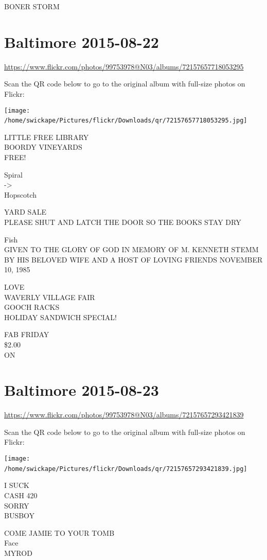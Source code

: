 \documentclass[10pt,letterpaper]{article}
\begin{document}
BONER STORM
\

\section*{Baltimore 2015-08-22}

\url{https://www.flickr.com/photos/99753978@N03/albums/72157657718053295}

Scan the QR code below to go to the original album with full-size photos on Flickr:

\texttt{[image: /home/swickape/Pictures/flickr/Downloads/qr/72157657718053295.jpg]}
\

LITTLE FREE LIBRARY\\
BOORDY VINEYARDS\\
FREE!

Spiral\\
{-}>\\
Hopscotch

YARD SALE\\
PLEASE SHUT AND LATCH THE DOOR SO THE BOOKS STAY DRY

Fish\\
GIVEN TO THE GLORY OF GOD IN MEMORY OF M. KENNETH STEMM BY HIS BELOVED WIFE AND A HOST OF LOVING FRIENDS NOVEMBER 10, 1985

LOVE\\
WAVERLY VILLAGE FAIR\\
GOOCH RACKS\\
HOLIDAY SANDWICH SPECIAL!

FAB FRIDAY\\
\$2.00\\
ON
\

\section*{Baltimore 2015-08-23}

\url{https://www.flickr.com/photos/99753978@N03/albums/72157657293421839}

Scan the QR code below to go to the original album with full-size photos on Flickr:

\texttt{[image: /home/swickape/Pictures/flickr/Downloads/qr/72157657293421839.jpg]}
\

I SUCK\\
CASH 420\\
SORRY\\
BUSBOY

COME JAMIE TO YOUR TOMB\\
Face\\
MYROD
\end{document}
